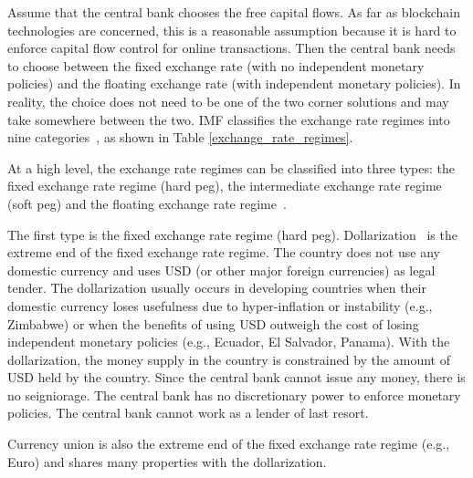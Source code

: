 \documentclass[dvipdfmx,a4paper]{article}
\begin{document}
Assume that the central bank chooses the free capital flows. As far as blockchain technologies are concerned, this is a reasonable assumption because it is hard to enforce capital flow control for online transactions. Then the central bank needs to choose between the fixed exchange rate (with no independent monetary policies) and the floating exchange rate (with independent monetary policies). In reality, the choice does not need to be one of the two corner solutions and may take somewhere between the two. IMF classifies the exchange rate regimes into nine categories~\cite{imfreport}, as shown in Table \ref{exchange_rate_regimes}.

At a high level, the exchange rate regimes can be classified into three types: the fixed exchange rate regime (hard peg), the intermediate exchange rate regime (soft peg) and the floating exchange rate regime~\cite{ghosh2002exchange}.

The first type is the fixed exchange rate regime (hard peg). Dollarization~\cite{calvo2002dollarization} is the extreme end of the fixed exchange rate regime. The country does not use any domestic currency and uses USD (or other major foreign currencies) as legal tender. The dollarization usually occurs in developing countries when their domestic currency loses usefulness due to hyper-inflation or instability (e.g., Zimbabwe) or when the benefits of using USD outweigh the cost of losing independent monetary policies (e.g., Ecuador, El Salvador, Panama). With the dollarization, the money supply in the country is constrained by the amount of USD held by the country. Since the central bank cannot issue any money, there is no seigniorage. The central bank has no discretionary power to enforce monetary policies. The central bank cannot work as a lender of last resort.

Currency union is also the extreme end of the fixed exchange rate regime (e.g., Euro) and shares many properties with the dollarization.
\end{document}

